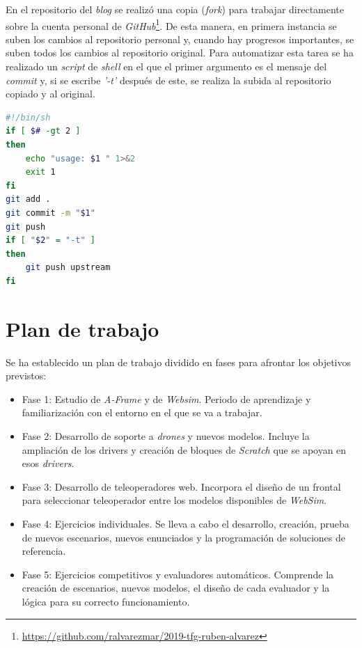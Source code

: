 En el repositorio del \textit{blog} se realizó una copia (\textit{fork}) para trabajar directamente sobre la cuenta personal de \textit{GitHub}\footnote{\url{https://github.com/ralvarezmar/2019-tfg-ruben-alvarez}}. De esta manera, en primera instancia se suben los cambios al repositorio personal y, cuando hay progresos importantes, se suben todos los cambios al repositorio original. Para automatizar esta tarea se ha realizado un \textit{script} de \textit{shell} en el que el primer argumento es el mensaje del \textit{commit} y, si se escribe \textit{'-t'} después de este, se realiza la subida al repositorio copiado y al original.

\begin{lstlisting}[language=bash, caption=\textit{Script} para subir código a \textit{GitHub}]
#!/bin/sh
if [ $# -gt 2 ]
then
	echo "usage: $1 " 1>&2
	exit 1
fi
git add .
git commit -m "$1"
git push
if [ "$2" = "-t" ]
then
	git push upstream
fi
\end{lstlisting}

\section{Plan de trabajo}
\label{sec:plan}

Se ha establecido un plan de trabajo dividido en fases para afrontar los objetivos previstos: 
\begin{itemize}
    \item Fase 1: Estudio de \textit{A-Frame} y de \textit{Websim}. Periodo de aprendizaje y familiarización con el entorno en el que se va a trabajar. 
    \item Fase 2: Desarrollo de soporte a \textit{drones} y nuevos modelos. Incluye la ampliación de los drivers y creación de bloques de \textit{Scratch} que se apoyan en esos \textit{drivers}.
    \item Fase 3: Desarrollo de teleoperadores web. Incorpora el diseño de un frontal para seleccionar teleoperador entre los modelos disponibles de \textit{WebSim}.
    \item Fase 4: Ejercicios individuales. Se lleva a cabo el desarrollo, creación, prueba de nuevos escenarios, nuevos enunciados y la programación de soluciones de referencia. 
    \item Fase 5: Ejercicios competitivos y evaluadores automáticos. Comprende la creación de escenarios, nuevos modelos, el diseño de cada evaluador y la lógica para su correcto funcionamiento. 
\end{itemize}